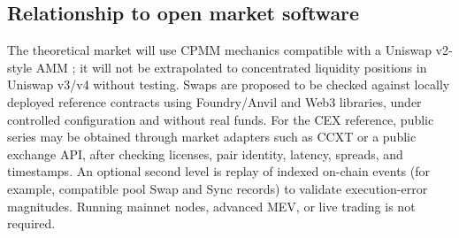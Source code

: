 \subsection{Relationship to open market software}

The theoretical market will use CPMM mechanics compatible with a Uniswap v2-style AMM
\cite{adams2020uniswap,angeris2020cfmm}; it will not be extrapolated to concentrated
liquidity positions in Uniswap v3/v4 without testing. Swaps are proposed to be checked
against locally deployed reference contracts using Foundry/Anvil and Web3 libraries,
under controlled configuration and without real funds. For the CEX reference, public
series may be obtained through market adapters such as CCXT or a public exchange API,
after checking licenses, pair identity, latency, spreads, and timestamps. An optional
second level is replay of indexed on-chain events (for example, compatible pool Swap
and Sync records) to validate execution-error magnitudes. Running mainnet nodes,
advanced MEV, or live trading is not required.
